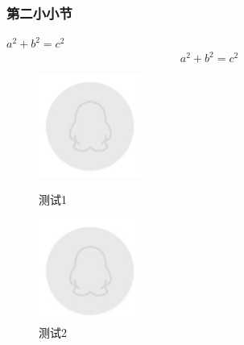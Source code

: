 \subsubsection{第二小小节}
\par $a^2+b^2=c^2$
\[
a^2+b^2=c^2
\]

\begin{figure}[htbp]
	\centering
	\begin{minipage}[c]{0.5\textwidth}
		\centering
		\includegraphics[width=0.3\textwidth]{figures/figure1.jpg}
		\caption{测试1}
	\end{minipage}%
	\begin{minipage}[c]{0.5\textwidth}
		\centering
		\includegraphics[width=0.3\textwidth]{figures/figure1.jpg}
		\caption{测试2}
	\end{minipage}
\end{figure}
